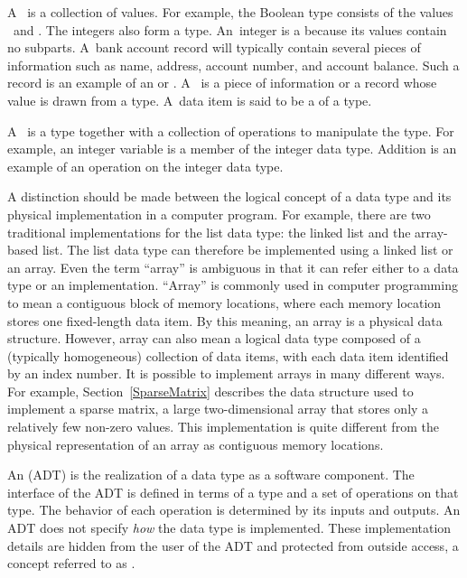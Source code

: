 A~ is a collection of values.
For example, the Boolean type consists of the values \TRUE\ and \FALSE.
The integers also form a type.
An~integer is a 
because its values contain no subparts.
A~bank account record will typically contain several pieces of
information such as name, address, account number, and account
balance.
Such a record is an example of an  or
.
A~ is a piece of information
or a record whose value is drawn from a type.
A~data item is said to be a
 of a type.

A~ is a type
together with a collection of operations to manipulate the type.
For example, an integer variable is a member of
the integer data type.
Addition is an example of an operation on the integer data type.

A distinction should be made between the
logical concept of a data type and its physical implementation in a
computer program.
For example, there are two traditional implementations
for the list data type:
the linked list and the array-based
list.
The list data type can therefore be implemented using a linked list or
an array.
Even the term ``array'' is ambiguous in that it can refer either
to a data type or an implementation.
``Array'' is commonly used in computer programming to mean a
contiguous block of memory locations,
where each memory location stores one fixed-length data item.
By this meaning, an array is a physical data structure.
However, array can also mean a logical data type composed of a
(typically homogeneous) collection of data items, with each data item
identified by an index number.
It is possible to implement arrays in many different ways.
For example, Section~\ref{SparseMatrix} describes the data structure
used to implement a sparse matrix, a large
two-dimensional array that stores only a relatively few non-zero
values.
This implementation is quite different from the physical
representation of an array as
contiguous memory locations.

An  (ADT) is the realization of a data type
as a software component.
The interface of the ADT is defined in terms of a type and a set of
operations on that type.
The behavior of each operation is determined by its inputs and outputs.
An ADT does not specify \emph{how} the data type is implemented.
These implementation details are hidden from the user of the ADT and
protected from outside access, a concept referred to as
.

